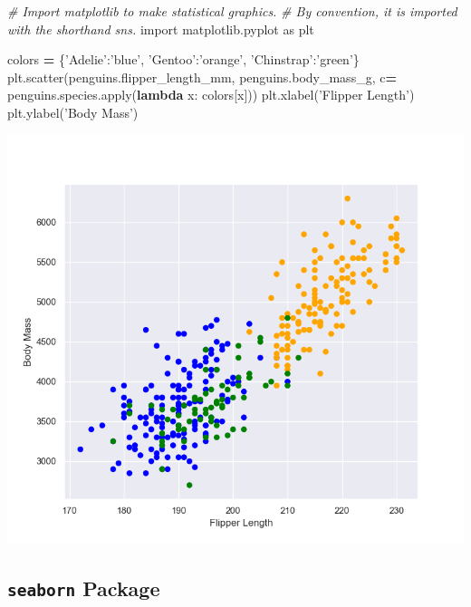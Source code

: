 \documentclass[]{book}
\newenvironment{Shaded}{\begin{snugshade}}{\end{snugshade}}
\newcommand{\BuiltInTok}[1]{#1}
\newcommand{\CommentTok}[1]{\textcolor[rgb]{0.56,0.35,0.01}{\textit{#1}}}
\newcommand{\ImportTok}[1]{#1}
\newcommand{\KeywordTok}[1]{\textcolor[rgb]{0.13,0.29,0.53}{\textbf{#1}}}
\newcommand{\NormalTok}[1]{#1}
\newcommand{\OperatorTok}[1]{\textcolor[rgb]{0.81,0.36,0.00}{\textbf{#1}}}
\newcommand{\StringTok}[1]{\textcolor[rgb]{0.31,0.60,0.02}{#1}}
\begin{document}
\begin{Shaded}
\begin{Highlighting}[]
\CommentTok{# Import matplotlib to make statistical graphics. }
\CommentTok{# By convention, it is imported with the shorthand sns.}
\ImportTok{import}\NormalTok{ matplotlib.pyplot }\ImportTok{as}\NormalTok{ plt}

\NormalTok{colors }\OperatorTok{=}\NormalTok{ \{}\StringTok{'Adelie'}\NormalTok{:}\StringTok{'blue'}\NormalTok{, }\StringTok{'Gentoo'}\NormalTok{:}\StringTok{'orange'}\NormalTok{, }\StringTok{'Chinstrap'}\NormalTok{:}\StringTok{'green'}\NormalTok{\}}
\NormalTok{plt.scatter(penguins.flipper_length_mm,}
\NormalTok{penguins.body_mass_g, }
\NormalTok{c}\OperatorTok{=}\NormalTok{ penguins.species.}\BuiltInTok{apply}\NormalTok{(}\KeywordTok{lambda}\NormalTok{ x: colors[x]))}
\NormalTok{plt.xlabel(}\StringTok{'Flipper Length'}\NormalTok{)}
\NormalTok{plt.ylabel(}\StringTok{'Body Mass'}\NormalTok{)}
\end{Highlighting}
\end{Shaded}

\begin{center}\includegraphics[width=0.9\linewidth]{fig/Viz_chap/1_matplot} \end{center}

\hypertarget{seaborn-package}{%
\subsection{\texorpdfstring{\texttt{seaborn} Package}{seaborn Package}}\label{seaborn-package}}
\end{document}
